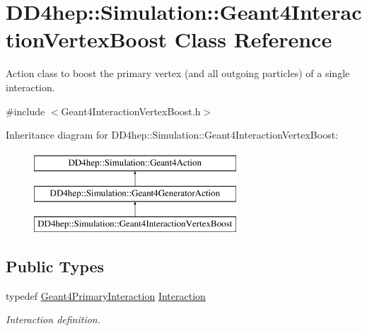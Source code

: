 \hypertarget{class_d_d4hep_1_1_simulation_1_1_geant4_interaction_vertex_boost}{}\section{D\+D4hep\+:\+:Simulation\+:\+:Geant4\+Interaction\+Vertex\+Boost Class Reference}
\label{class_d_d4hep_1_1_simulation_1_1_geant4_interaction_vertex_boost}


Action class to boost the primary vertex (and all outgoing particles) of a single interaction.  




{\ttfamily \#include $<$Geant4\+Interaction\+Vertex\+Boost.\+h$>$}

Inheritance diagram for D\+D4hep\+:\+:Simulation\+:\+:Geant4\+Interaction\+Vertex\+Boost\+:\begin{figure}[H]
\begin{center}
\leavevmode
\includegraphics[height=3.000000cm]{class_d_d4hep_1_1_simulation_1_1_geant4_interaction_vertex_boost}
\end{center}
\end{figure}
\subsection*{Public Types}
\begin{DoxyCompactItemize}
\item 
typedef \hyperlink{class_d_d4hep_1_1_simulation_1_1_geant4_primary_interaction}{Geant4\+Primary\+Interaction} \hyperlink{class_d_d4hep_1_1_simulation_1_1_geant4_interaction_vertex_boost_a24539ccb7908e132acaf99eeec5111e5}{Interaction}
\begin{DoxyCompactList}\small\item\em Interaction definition. \end{DoxyCompactList}\end{DoxyCompactItemize}
